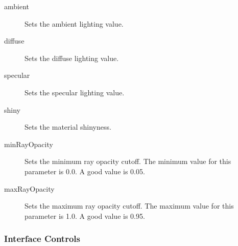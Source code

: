 \documentclass{article}
\begin{document}
\begin{description}
\begin{description}
\item [ambient]  Sets the ambient lighting value.

\item [diffuse]  Sets the diffuse lighting value.

\item [specular]  Sets the specular lighting value.

\item [shiny]  Sets the material shinyness.

\item [minRayOpacity]  Sets the minimum ray opacity cutoff.  The
minimum value for this parameter is 0.0.  A good value is 0.05.

\item [maxRayOpacity]  Sets the maximum ray opacity cutoff.  The
maximum value for this parameter is 1.0.  A good value is 0.95.
\end{description}

\end{description}


\subsubsection{Interface Controls}
\end{document}
